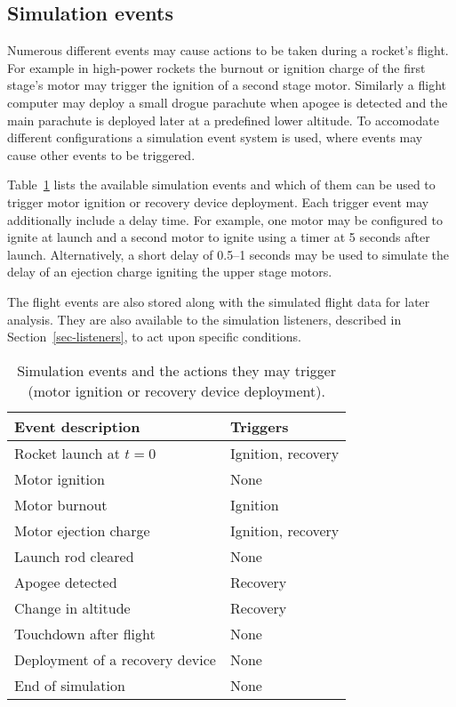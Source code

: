 \subsection{Simulation events}

Numerous different events may cause actions to be taken during a
rocket's flight.  For example in high-power rockets the burnout or
ignition charge of the first stage's motor may trigger the ignition of
a second stage motor.  Similarly a flight computer may deploy a small
drogue parachute when apogee is detected and the main parachute is
deployed later at a predefined lower altitude.  To accomodate
different configurations a simulation event system is used, where
events may cause other events to be triggered.

Table~\ref{tab-simulation-events} lists the available simulation
events and which of them can be used to trigger motor ignition or recovery
device deployment.  Each trigger event may additionally include a
delay time.  For example, one motor may be configured to ignite at
launch and a second motor to ignite using a timer at 5 seconds after
launch.  Alternatively, a short delay of 0.5--1 seconds may be used to
simulate the delay of an ejection charge igniting the upper stage
motors.

The flight events are also stored along with the simulated flight data
for later analysis.  They are also available to the simulation
listeners, described in Section~\ref{sec-listeners}, to act upon
specific conditions.

\begin{table}
\caption{Simulation events and the actions they may trigger (motor
  ignition or recovery device deployment).}
\label{tab-simulation-events}
%
\begin{center}
\begin{tabular}{ll}
Event description & Triggers \\
\hline
Rocket launch at $t=0$          & Ignition, recovery \\
Motor ignition                  & None \\
Motor burnout                   & Ignition \\
Motor ejection charge           & Ignition, recovery \\
Launch rod cleared              & None \\
Apogee detected                 & Recovery \\
Change in altitude              & Recovery \\
Touchdown after flight          & None \\
Deployment of a recovery device & None \\
End of simulation               & None \\
\hline
\end{tabular}
\end{center}
\end{table}





